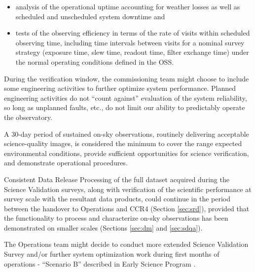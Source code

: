 \begin{itemize}
        \item analysis of the operational uptime accounting for weather losses as well as scheduled and unscheduled system downtime and
        \item tests of the observing efficiency in terms of the rate of visits within scheduled observing time, including time intervals between visits for a nominal survey strategy (exposure time, slew time, readout time, filter exchange time) under the normal operating conditions defined in the OSS.
\end{itemize}

During the verification window, the commissioning team might choose to include some engineering activities to further optimize system performance. Planned engineering activities do not ``count against'' evaluation of the system reliability, so long as unplanned faults, etc., do not limit our ability to predictably operate the observatory.

A 30-day period of sustained on-sky observations, routinely delivering acceptable science-quality images, is considered the minimum to cover the range expected environmental conditions, provide sufficient opportunities for science verification, and demonstrate operational procedures.

Consistent Data Release Processing of the full dataset acquired during the Science Validation surveys, along with verification of the scientific performance at survey scale with the resultant data products, could continue in the period between the handover to Operations and CCR4 (Section \ref{sec:srd}), provided that the functionality to process and characterize on-sky observations has been demonstrated on smaller scales (Sections \ref{sec:dm} and \ref{sec:sdqa}).

The Operations team might decide to conduct more extended Science Validation Survey and/or further system optimization work during first months of operations - ``Scenario B'' described in Early Science Program .


